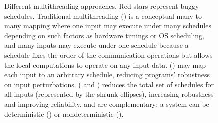 \begin{figure}[t]
\begin{center}
\vspace{-.05in}
\caption{Different multithreading approaches. Red stars represent buggy
schedules.  Traditional multithreading () is a conceptual
many-to-many mapping where one input may execute under many schedules depending
on such factors as hardware timings or OS scheduling, and many inputs may
execute under one schedule because a schedule fixes the order of the
communication operations but allows the local computations to operate on any
input data.  \dmt () may map each input to an arbitrary
schedule, reducing programs' robustness on input perturbations.  \smt
( and ) reduces the total set of schedules
for all inputs (represented by the shrunk ellipses), increasing robustness and
improving reliability. \smt and \dmt are complementary: a \smt system can be
deterministic () or nondeterministic ().}
\vspace{-.2in}
\end{center}
\end{figure}

